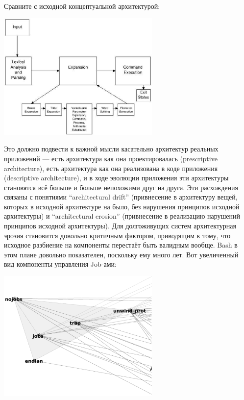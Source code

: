 \documentclass[a5paper]{article}
\begin{document}
Сравните с исходной концептуальной архитектурой:

\begin{center}
	\includegraphics[width=0.6\textwidth]{bashArchitecture.png}
\end{center}

Это должно подвести к важной мысли касательно архитектур реальных приложений --- есть архитектура как она проектировалась (prescriptive architecture), есть архитектура как она реализована в коде приложения (descriptive architecture), и в ходе эволюции приложения эти архитектуры становятся всё больше и больше непохожими друг на друга. Эти расхождения связаны с понятиями ``architectural drift'' (привнесение в архитектуру вещей, которых в исходной архитектуре на было, без нарушения принципов исходной архитектуры) и ``architectural erosion'' (привнесение в реализацию нарушений принципов исходной архитектуры). Для долгоживущих систем архитектурная эрозия становится довольно критичным фактором, приводящим к тому, что исходное разбиение на компоненты перестаёт быть валидным вообще. Bash в этом плане довольно показателен, поскольку ему много лет. Вот увеличенный вид компоненты управления Job-ами:

\begin{center}
	\includegraphics[width=0.6\textwidth]{bashJobControl.png}
\end{center}
\end{document}
